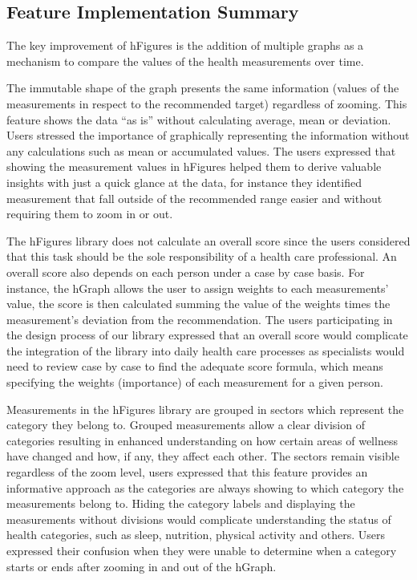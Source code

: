 \documentclass[twocolumn]{bmcart}%
\begin{document}
\subsection*{Feature Implementation Summary}

The key improvement of hFigures is the addition of multiple graphs as a mechanism to compare the values of the health measurements over time.

The immutable shape of the graph presents the same information (values of the measurements in respect to the recommended target) regardless of zooming. This feature shows the data ``as is'' without calculating average, mean or deviation. Users stressed the importance of graphically representing the information without any calculations such as mean or accumulated values. The users expressed that showing the measurement values in hFigures helped them to derive valuable insights with just a quick glance at the data, for instance they identified measurement that fall outside of the recommended range easier and without requiring them to zoom in or out.

The hFigures library does not calculate an overall score since the users considered that this task should be the sole responsibility of a health care professional. An overall score also depends on each person under a case by case basis. For instance, the hGraph allows the user to assign weights to each measurements' value, the score is then calculated summing the value of the weights times the measurement's deviation from the recommendation. The users participating in the design process of our library expressed that an overall score would complicate the integration of the library into daily health care processes as specialists would need to review case by case to find the adequate score formula, which means specifying the weights (importance) of each measurement for a given person.

Measurements in the hFigures library are grouped in sectors which represent the category they belong to. Grouped measurements allow a clear division of categories resulting in enhanced understanding on how certain areas of wellness have changed and how, if any, they affect each other. The sectors remain visible regardless of the zoom level, users expressed that this feature provides an informative approach as the categories are always showing to which category the measurements belong to. Hiding the category labels and displaying the measurements without divisions would complicate understanding the status of health categories, such as sleep, nutrition, physical activity and others. Users expressed their confusion when they were unable to determine when a category starts or ends after zooming in and out of the hGraph.
\end{document}
